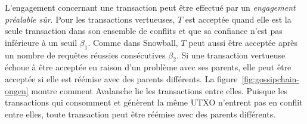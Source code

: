 
L'engagement concernant une transaction peut être effectué par un \emph{engagement préalable sûr}. Pour les transactions vertueuses, $T$ est acceptée quand elle est la seule transaction dans son ensemble de conflits et que sa confiance n'est pas inférieure à un seuil $\beta_1$.
Comme dans Snowball, $T$ peut aussi être acceptée après un nombre de requêtes réussies consécutives $\beta_2$.
Si une transaction vertueuse échoue à être acceptée en raison d'un problème avec ses parents, elle peut être acceptée si elle est réémise avec des parents différents.
La figure~\ref{fig:gossipchain-ongen} montre comment Avalanche lie les transactions entre elles. Puisque les transactions qui consomment et génèrent la même UTXO n'entrent pas en conflit entre elles, toute transaction peut être réémise avec des parents différents.

